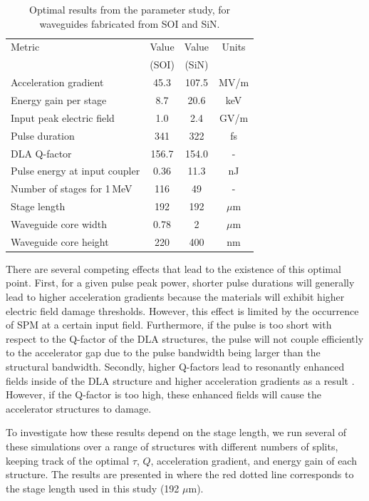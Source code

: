 \begin{table}[htb]
    \caption{\label{tab:results} Optimal results from the parameter study, for waveguides fabricated from SOI and SiN.}
    \centering
    \begin{tabular}{lccc}
        \hline
        Metric & Value & Value & Units \\
         & (SOI) & (SiN) & \\
        \hline
        Acceleration gradient & 45.3 & 107.5 & MV/m \\
        Energy gain per stage & 8.7 & 20.6 & keV \\
        Input peak electric field & 1.0 & 2.4 & GV/m \\ 
        Pulse duration & 341 & 322 & fs \\
        DLA Q-factor & 156.7 & 154.0 & - \\
        Pulse energy at input coupler & 0.36 & 11.3 & nJ \\
        Number of stages for 1\,MeV & 116 & 49 & - \\
        Stage length & 192 & 192 & $\mu$m \\
        Waveguide core width & 0.78 & 2 & $\mu$m \\
        Waveguide core height & 220 & 400 & nm \\
        \hline
    \end{tabular}
\end{table}


There are several competing effects that lead to the existence of this optimal point. First, for a given pulse peak power, shorter pulse durations will generally lead to higher acceleration gradients because the materials will exhibit higher electric field damage thresholds. However, this effect is limited by the occurrence of SPM at a certain input field. Furthermore, if the pulse is too short with respect to the Q-factor of the DLA structures, the pulse will not couple efficiently to the accelerator gap due to the pulse bandwidth being larger than the structural bandwidth. Secondly, higher Q-factors lead to resonantly enhanced fields inside of the DLA structure and higher acceleration gradients as a result \cite{deng2017design}. However, if the Q-factor is too high, these enhanced fields will cause the accelerator structures to damage.

To investigate how these results depend on the stage length, we run several of these simulations over a range of structures with different numbers of splits, keeping track of the optimal $\tau$, $Q$, acceleration gradient, and energy gain of each structure.  The results are presented in  where the red dotted line corresponds to the stage length used in this study (192 $\mu$m).

